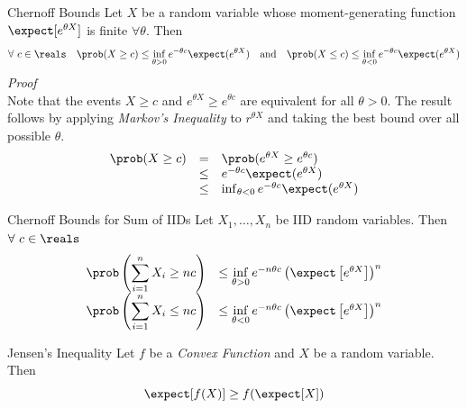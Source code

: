 \documentclass[11pt,a4paper]{article}
\begin{document}
  \begin{theorem}{Chernoff Bounds}
    Let $X$ be a random variable whose moment-generating function $\expect[e^{\theta X}]$ is finite $\forall\theta$. Then
    \[ \forall\ c\in\reals\quad\prob(X\geq c)\leq\inf_{\theta>0}e^{-\theta c}\expect(e^{\theta X})\quad\text{and}\quad\prob(X\leq c)\leq\inf_{\theta<0}e^{-\theta c}\expect(e^{\theta X}) \]
    \textit{Proof}\\
    Note that the events $X\geq c$ and $e^{\theta X}\geq e^{\theta c}$ are equivalent for all $\theta>0$. The result follows by applying \textit{Markov's Inequality} to $r^{\theta X}$ and taking the best bound over all possible $\theta$.
    \[\begin{array}{rcl}
      \prob(X\geq c)&=&\prob(e^{\theta X}\geq e^{\theta c})\\
      &\leq&e^{-\theta c}\expect(e^{\theta X})\\
      &\leq&\inf_{\theta<0}e^{-\theta c}\expect(e^{\theta X}) %
    \end{array}\]
  \end{theorem}

  \begin{theorem}{Chernoff Bounds for Sum of IIDs}
    Let $X_1,\dots,X_n$ be IID random variables. Then $\forall\ c\in\reals$
    \[\begin{array}{rcl}
      {\displaystyle\prob\left(\sum_{i=1}^nX_i\geq nc\right)}&\leq\inf\limits_{\theta>0}e^{-n\theta c}\left(\expect\left[e^{\theta X}\right]\right)^n\\
      {\displaystyle\prob\left(\sum_{i=1}^nX_i\leq nc\right)}&\leq\inf\limits_{\theta<0}e^{-n\theta c}\left(\expect\left[e^{\theta X}\right]\right)^n
    \end{array}\]
  \end{theorem}

  \begin{theorem}{Jensen's Inequality}
    Let $f$ be a \textit{Convex Function} and $X$ be a random variable. Then
    \[ \expect[f(X)]\geq f(\expect[X]) \]
  \end{theorem}
\end{document}

